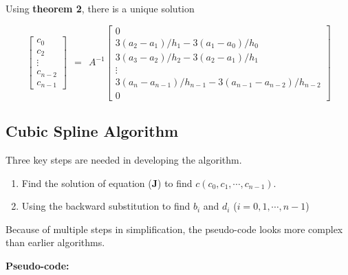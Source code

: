 \documentclass[
]{book}
\begin{document}
Using \textbf{theorem 2}, there is a unique solution

\[
\left[
\begin{array}{c}
c_0 \\
c_2 \\
\vdots\\
c_{n-2} \\
c_{n-1}
\end{array}
\right]
~~=~~
A^{-1}\left[
\begin{array}{c}
0 \\
3(a_2-a_1)/h_1 - 3(a_1-a_0)/h_0 \\
3(a_3-a_2)/h_2 - 3(a_2-a_1)/h_1 \\
\vdots\\
3(a_n-a_{n-1})/h_{n-1} - 3(a_{n-1}-a_{n-2})/h_{n-2} \\
0
\end{array}
\right]
\]

\hypertarget{cubic-spline-algorithm}{%
\subsection{Cubic Spline Algorithm}\label{cubic-spline-algorithm}}

Three key steps are needed in developing the algorithm.

\begin{enumerate}
\def\labelenumi{\arabic{enumi}.}
\item
  Find the solution of equation (\textbf{J}) to find \(c(c_0, c_1, \cdots, c_{n-1})\).
\item
  Using the backward substitution to find \(b_i\) and \(d_i\) (\(i = 0, 1, \cdots, n-1\))
\end{enumerate}

Because of multiple steps in simplification, the pseudo-code looks more complex than earlier algorithms.

\hfill\break

\textbf{Pseudo-code:}
\end{document}
